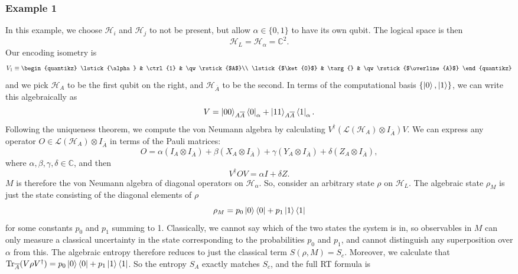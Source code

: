 \documentclass[12pt,a4paper]{report}
\numberwithin{equation}{section}
\newcommand{\ketbra}[2]{\ket{#1}\bra{#2}}
\newcommand{\ketbras}[1]{\ketbra{#1}{#1}}
\newcommand{\ol}[1]{\overline{#1}}
\newcommand{\tr}{\text{Tr}}
\theoremstyle{definition}
\theoremstyle{theorem}
\theoremstyle{theorem}
\theoremstyle{example}
\theoremstyle{definition}
\begin{document}
\subsubsection{Example 1}\label{E1}
In this example, we choose $\mathcal{H}_{i}$ and $\mathcal{H}_{j}$ to not be present, but allow $\alpha\in\{0,1\}$ to have its own qubit. The logical space is then
\begin{equation}
	\mathcal{H}_{L}=\mathcal{H}_{\alpha}=\mathbb{C}^{2}.
\end{equation}
Our encoding isometry is
\begin{equation}
	V_{1}\equiv
			\begin{quantikz}
			\lstick{\alpha} & \ctrl{1} & \qw\rstick{$A$}\\
			\lstick{$\ket{0}$} & \targ{} & \qw\rstick{$\ol{A}$}
			\end{quantikz}
\end{equation}
and we pick $\mathcal{H}_{A}$ to be the first qubit on the right, and $\mathcal{H}_{\ol{A}}$ to be the second. In terms of the computational basis $\{\ket{0},\ket{1}\}$, we can write this algebraically as
\begin{equation}
	V=\ket{00}_{A\ol{A}}\bra{0}_{\alpha}+\ket{11}_{A\ol{A}}\bra{1}_{\alpha}.
\end{equation}
Following the uniqueness theorem, we compute the von Neumann algebra by calculating $V^{\dagger}(\mathcal{L}(\mathcal{H}_{A})\otimes I_{\ol{A}})V$. We can express any operator $O\in\mathcal{L}(\mathcal{H}_{A})\otimes I_{\ol{A}}$ in terms of the Pauli matrices:
\begin{equation}
	O=\alpha(I_{A}\otimes I_{\ol{A}})+\beta(X_{A}\otimes I_{\ol{A}})+\gamma(Y_{A}\otimes I_{\ol{A}})+\delta(Z_{A}\otimes I_{\ol{A}}),
\end{equation}
where $\alpha,\beta,\gamma,\delta\in\mathbb{C}$, and then
\begin{equation}
	V^{\dagger}OV=\alpha I+\delta Z.
\end{equation}
$M$ is therefore the von Neumann algebra of diagonal operators on $\mathcal{H}_{\alpha}$. So, consider an arbitrary state $\rho$ on $\mathcal{H}_{L}$. The algebraic state $\rho_{M}$ is just the state consisting of the diagonal elements of $\rho$
\begin{equation}
	\rho_{M}=p_{0}\ketbras{0}+p_{1}\ketbras{1}
\end{equation}
for some constants $p_{0}$ and $p_{1}$ summing to 1. Classically, we cannot say which of the two states the system is in, so observables in $M$ can only measure a classical uncertainty in the state corresponding to the probabilities $p_{0}$ and $p_{1}$, and cannot distinguish any superposition over $\alpha$ from this. The algebraic entropy therefore reduces to just the classical term $S(\rho,M)=S_{c}$. Moreover, we calculate that $\tr_{\ol{A}}(V\rho V^{\dagger})=p_{0}\ketbras{0}+p_{1}\ketbras{1}$. So the entropy $S_{A}$ exactly matches $S_{c}$, and the full RT formula is
\end{document}
